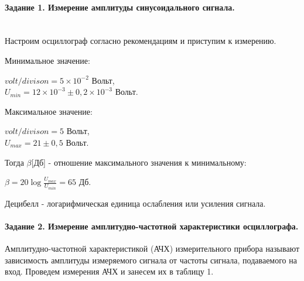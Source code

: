 \documentclass[a4paper,12pt]{report}
\begin{document}
{	\paragraph{Задание 1. Измерение амплитуды синусоидального сигнала. }
	
	\text\par{ \\ Настроим осциллограф согласно рекомендациям и приступим к измерению.}
	\\
	\text\par{ { }	 Минимальное значение:}
	
	\begin{center}
	
	$volt/divison=5\times10^{-2}$ Вольт, \\ $U_{min}=12 \times 10^{-3} \pm 0,2 \times 10^{-3}$ Вольт.
	
	\end{center}
	
	\text\par{Максимальное значение:}
	
	\begin{center}
	
	$volt/divison=5$ Вольт, \\ $U_{max}=21 \pm 0,5$ Вольт.
	
	\end{center}
	
	\text\par{Тогда $\beta$[Дб] - отношение максимального значения к минимальному:}
	
	\begin{center}
	
	$\beta=20\log{\frac{U_{max}}{U_{min}}}=65$ Дб.
	
	\end{center}
	
	\text\par{Децибелл - логарифмическая единица ослабления или усиления сигнала. }	
	

	\paragraph{Задание 2. Измерение амплитудно-частотной характеристики осциллографа.}

	\text\par{Амплитудно-частотной характеристикой (АЧХ) измерительного прибора называют зависимость амплитуды измеряемого сигнала от частоты сигнала, подаваемого на вход. Проведем измерения АЧХ и занесем их в таблицу 1.}
	
}
\end{document}

